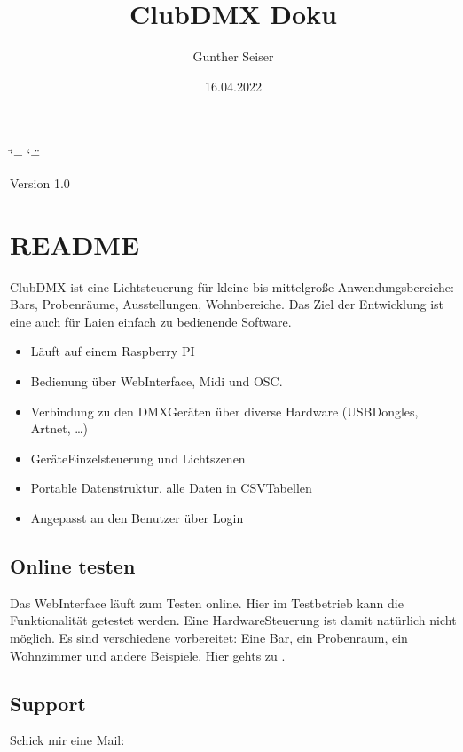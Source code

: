 \documentclass[letterpaper,10pt,ngerman]{sphinxmanual}
\title{ClubDMX Doku}
\date{16.04.2022}
\author{Gunther Seiser}
\begin{document}
\ifdefined\shorthandoff
  \ifnum\catcode`\=\string=\active\shorthandoff{=}\fi
  \ifnum\catcode`\"=\active{}\fi
\fi

\pagestyle{empty}
\sphinxmaketitle
\pagestyle{plain}
\sphinxtableofcontents
\pagestyle{normal}
\label{\detokenize{inhalt::doc}}


Version 1.0


\chapter{README}
\label{\detokenize{readme:readme}}\label{\detokenize{readme::doc}}
ClubDMX ist eine Lichtsteuerung für kleine bis mittelgroße Anwendungsbereiche:
Bars, Probenräume, Ausstellungen, Wohnbereiche. Das Ziel der Entwicklung ist
eine auch für Laien einfach zu bedienende Software.
\begin{itemize}
\item {} 
Läuft auf einem Raspberry PI

\item {} 
Bedienung über Web\sphinxhyphen{}Interface, Midi und OSC.

\item {} 
Verbindung zu den DMX\sphinxhyphen{}Geräten über diverse Hardware
(USB\sphinxhyphen{}Dongles, Artnet, …)

\item {} 
Geräte\sphinxhyphen{}Einzelsteuerung und Lichtszenen

\item {} 
Portable Datenstruktur, alle Daten in CSV\sphinxhyphen{}Tabellen

\item {} 
Angepasst an den Benutzer über Login

\end{itemize}


\section{Online testen}
\label{\detokenize{readme:online-testen}}
Das Web\sphinxhyphen{}Interface läuft zum Testen online. Hier im Testbetrieb kann die
Funktionalität getestet werden. Eine Hardware\sphinxhyphen{}Steuerung ist damit natürlich
nicht möglich. Es sind verschiedene  vorbereitet: Eine Bar,
ein Probenraum, ein Wohnzimmer und andere Beispiele. Hier gehts zu
 .


\section{Support}
\label{\detokenize{readme:support}}
Schick mir eine Mail: 
\end{document}

